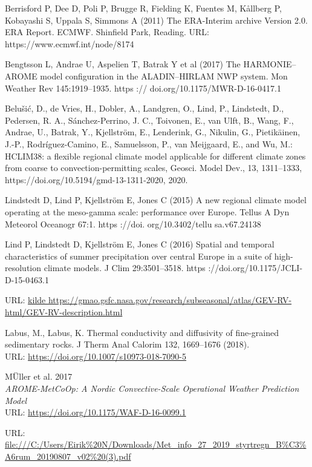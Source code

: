 \begin{thebibliography}{9}
Berrisford P, Dee D, Poli P, Brugge R, Fielding K, Fuentes M, Kållberg P, Kobayashi S, Uppala S, Simmons A (2011)
The ERA-Interim archive Version 2.0. ERA Report. ECMWF. Shinfield Park, Reading. URL: https://www.ecmwf.int/node/8174

Bengtsson L, Andrae U, Aspelien T, Batrak Y et al (2017) The HARMONIE–
AROME model configuration in the ALADIN–HIRLAM
NWP system. Mon Weather Rev 145:1919–1935. https ://
doi.org/10.1175/MWR-D-16-0417.1

Belušić, D., de Vries, H., Dobler, A., Landgren, O., Lind, P., Lindstedt, D., Pedersen, R. A., Sánchez-Perrino, J. C., Toivonen, E., van Ulft, B., Wang, F., Andrae, U., Batrak, Y., Kjellström, E., Lenderink, G., Nikulin, G., Pietikäinen, J.-P., Rodríguez-Camino, E., Samuelsson, P., van Meijgaard, E., and Wu, M.: HCLIM38: a flexible regional climate model applicable for different climate zones from coarse to convection-permitting scales, Geosci. Model Dev., 13, 1311–1333, https://doi.org/10.5194/gmd-13-1311-2020, 2020.

Lindstedt D, Lind P, Kjellström E, Jones C (2015) A new regional
climate model operating at the meso-gamma scale: performance
over Europe. Tellus A Dyn Meteorol Oceanogr 67:1. https ://doi.
org/10.3402/tellu sa.v67.24138

Lind P, Lindstedt D, Kjellström E, Jones C (2016) Spatial and temporal
characteristics of summer precipitation over central Europe in a
suite of high-resolution climate models. J Clim 29:3501–3518.
https ://doi.org/10.1175/JCLI-D-15-0463.1

URL: \url{kilde https://gmao.gsfc.nasa.gov/research/subseasonal/atlas/GEV-RV-html/GEV-RV-description.html}

Labus, M., Labus, K. Thermal conductivity and diffusivity of fine-grained sedimentary rocks. J Therm Anal Calorim 132, 1669–1676 (2018). \\
URL: \url{https://doi.org/10.1007/s10973-018-7090-5}

MÜller et al. 2017\\
\textit{AROME-MetCoOp: A Nordic Convective-Scale Operational
Weather Prediction Model}\\
URL: \url{https://doi.org/10.1175/WAF-D-16-0099.1}

URL: \url{file:///C:/Users/Eirik%20N/Downloads/Met_info_27_2019_styrtregn_B%C3%A6rum_20190807_v02%20(3).pdf}


\end{thebibliography}
